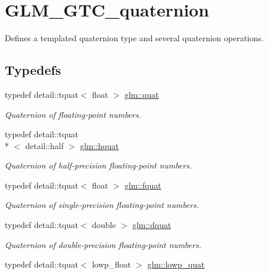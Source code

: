 \hypertarget{group__gtc__quaternion}{\section{G\-L\-M\-\_\-\-G\-T\-C\-\_\-quaternion}
\label{group__gtc__quaternion}
}


Defines a templated quaternion type and several quaternion operations.  


\subsection*{Typedefs}
\begin{DoxyCompactItemize}
\item 
typedef detail\-::tquat$<$ float $>$ \hyperlink{group__gtc__quaternion_gae334c5746195639da0ed726b747aeee3}{glm\-::quat}
\begin{DoxyCompactList}\small\item\em Quaternion of floating-\/point numbers. \end{DoxyCompactList}\item 
typedef detail\-::tquat\\*
$<$ detail\-::half $>$ \hyperlink{group__gtc__quaternion_ga9601a7ab2375426d8f302f0be9507586}{glm\-::hquat}
\begin{DoxyCompactList}\small\item\em Quaternion of half-\/precision floating-\/point numbers. \end{DoxyCompactList}\item 
typedef detail\-::tquat$<$ float $>$ \hyperlink{group__gtc__quaternion_ga026fc67b7357f270b8226f9bcd1ac2c1}{glm\-::fquat}
\begin{DoxyCompactList}\small\item\em Quaternion of single-\/precision floating-\/point numbers. \end{DoxyCompactList}\item 
typedef detail\-::tquat$<$ double $>$ \hyperlink{group__gtc__quaternion_ga80d5f590dba4e894218e1263233b02bb}{glm\-::dquat}
\begin{DoxyCompactList}\small\item\em Quaternion of double-\/precision floating-\/point numbers. \end{DoxyCompactList}\item 
typedef detail\-::tquat$<$ lowp\-\_\-float $>$ \hyperlink{group__gtc__quaternion_ga0754d8cacc7c48dd300ea7cd2846d1d8}{glm\-::lowp\-\_\-quat}

\end{DoxyCompactItemize}
